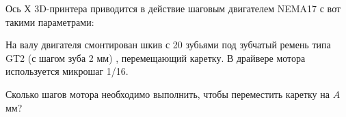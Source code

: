 

Ось Х 3D-принтера приводится в действие шаговым двигателем NEMA17  с вот такими параметрами:


На валу двигателя смонтирован шкив с 20 зубьями под зубчатый ремень типа GT2 (с шагом зуба 2 мм) ,  перемещающий каретку.   В драйвере мотора используется микрошаг 1/16.

Сколько шагов мотора необходимо выполнить, чтобы переместить каретку на $A$ мм?

